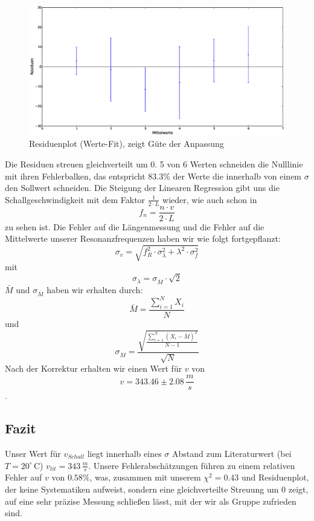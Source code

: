 \documentclass[12pt,a4paper]{article}
\begin{document}
\begin{figure}[H]
\centering
\includegraphics[scale=0.3]{Bilder/Residuen_Variation_Frequenzen.eps}
\caption{Residuenplot (Werte-Fit), zeigt Güte der Anpassung}
\end{figure}
Die Residuen streuen gleichverteilt um 0. 5 von 6 Werten schneiden die Nulllinie mit ihren Fehlerbalken, das entspricht $83.3\%$ der Werte die innerhalb von einem $\sigma$ den Sollwert schneiden. 
Die Steigung der Linearen Regression gibt uns die Schallgeschwindigkeit mit dem Faktor $\frac{1}{2\cdot L}$ wieder, wie auch schon in
\begin{equation}
f_n = \frac{n\cdot v}{2\cdot L}
\end{equation}
zu sehen ist.
Die Fehler auf die Längenmessung und die Fehler auf die Mittelwerte unserer Resonanzfrequenzen haben wir wie folgt fortgepflanzt:
\begin{equation}
\sigma_v = \sqrt{f_R^2\cdot\sigma_{\lambda}^2 + \lambda^2\cdot\sigma_f^2}
\end{equation}
mit
\begin{equation}
\sigma_{\lambda} = \sigma_{\bar{M}}\cdot\sqrt{2}
\end{equation}
$\bar{M}$ und $\sigma_{\bar{M}}$ haben wir erhalten durch:
\begin{equation}
\bar{M} = \frac{\sum_{i=1}^{N}{X_i}}{N}
\end{equation}
und
\begin{equation}
\sigma_{\bar{M}}=\frac{\sqrt{\frac{\sum_{i=1}^{N}({X_i-\bar{M}})^2}{N-1}}}{\sqrt{N}}
\end{equation}
Nach der Korrektur erhalten wir einen Wert für $v$ von
\begin{equation}
v = 343.46 \pm 2.08\,\frac{m}{s}
\end{equation}.

\subsection{Fazit}
Unser Wert für $v_{Schall}$ liegt innerhalb eines $\sigma$ Abstand zum Literaturwert (bei $T = 20^{\circ}\,$C) $v_{lit}=343\,\frac{m}{s}$. Unsere Fehlerabschätzungen führen zu einem relativen Fehler auf $v$ von $0.58\%$, was, zusammen mit unserem $\chi^2 = 0.43$ und Residuenplot, der keine Systematiken aufweist, sondern eine gleichverteilte Streuung um 0 zeigt, auf eine sehr präzise Messung schließen lässt, mit der wir als Gruppe zufrieden sind.
\end{document}
